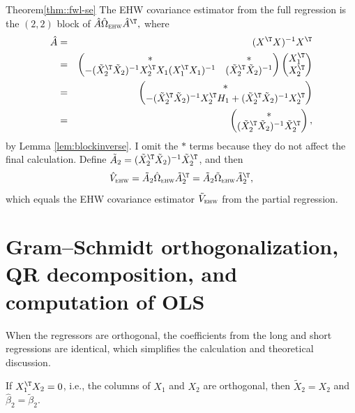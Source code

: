 \begin{myproof}{Theorem}{\ref{thm::fwl-se}}
The EHW covariance estimator from the full regression is the $(2,2)$ block of
$
 \hat{A}\hat{\Omega}_\textsc{ehw} \hat{A}^{\T},
$
where  
\begin{eqnarray*}
\hat{A} &=& (X ^{\T} X)^{-1} X ^{\T} \\
&=& \begin{pmatrix}
* & * \\
- (\tilde{X}_{2}^{\T}\tilde{X}_{2})^{-1}X_{2}^{\T} X_1(X_{1}^{\T}X_{1})^{-1} & (\tilde{X}_{2}^{\T}\tilde{X}_{2})^{-1}
\end{pmatrix}
\begin{pmatrix}
X_{1}^{\T}\\
X_{2}^{\T}
\end{pmatrix} \\
&=& \begin{pmatrix}
*\\
 -  ( \tilde{X}_2 ^{\T} \tilde{X}_2 )^{-1} X_2 ^{\T} H_1 + ( \tilde{X}_2 ^{\T}  \tilde{X}_2 )^{-1}X_2 ^{\T}
\end{pmatrix} \\
&=&\begin{pmatrix}
*\\
 ( \tilde{X}_2 ^{\T} \tilde{X}_2 )^{-1}\tilde{X}_2 ^{\T}
\end{pmatrix},
\end{eqnarray*}
by Lemma \ref{lem:blockinverse}. I omit the  $*$ terms because they do not affect the final calculation.
Define $\tilde{A}_2 =   ( \tilde{X}_2 ^{\T} \tilde{X}_2 )^{-1}\tilde{X}_2^{\T}$, and then
$$
\hat{V}_{\textsc{ehw}} 
= \tilde{A}_2 \hat{\Omega}_\textsc{ehw} \tilde{A}_2^{\T}
=  \tilde{A}_2 \tilde{\Omega}_\textsc{ehw}  \tilde{A}_2 ^{\T},
$$
which equals the EHW covariance estimator $\tilde{V}_{\textsc{ehw}}$ from the partial regression. 
\end{myproof}


 



\section{Gram--Schmidt orthogonalization, QR decomposition, and  computation of OLS}



 When the regressors are orthogonal, the coefficients from the long and short regressions are identical, which simplifies the calculation and theoretical discussion. 

\begin{corollary}
\label{cor:orthogonal}If $X_{1}^{\T}X_{2}=0$, i.e., the columns
of $X_{1}$ and $X_{2}$ are orthogonal, then $\tilde{X}_{2}=X_{2}$
and $\hat{\beta}_{2}=\tilde{\beta}_{2}.$ 
\end{corollary}


